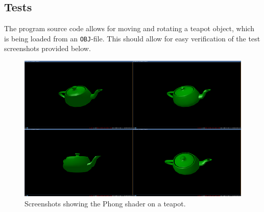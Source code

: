 \documentclass[11pt]{article}
\newcommand{\code}[1]{{\tt #1}}
\begin{document}
\subsection{Tests}
The program source code allows for moving and rotating a teapot object, which
is being loaded from an \code{OBJ}-file. This should allow for easy
verification of the test screenshots provided below.

\begin{figure}[H]
    \center
    \includegraphics[scale=0.5]{figures/screenshots}
    \caption{Screenshots showing the Phong shader on a teapot.}
    \label{code:test-screenshots}
\end{figure}
\end{document}
